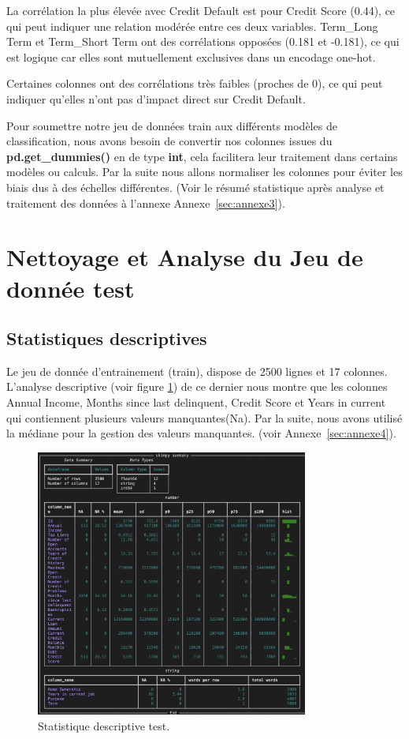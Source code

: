 \begin{flushleft}

La corrélation la plus élevée avec Credit Default est pour Credit Score (0.44), ce qui peut indiquer une relation modérée entre ces deux variables.
Term\_Long Term et Term\_Short Term ont des corrélations opposées (0.181 et -0.181), ce qui est logique car elles sont mutuellement exclusives dans un encodage one-hot.

Certaines colonnes ont des corrélations très faibles (proches de 0), ce qui peut indiquer qu'elles n'ont pas d'impact direct sur Credit Default.


Pour soumettre notre jeu de données train aux différents modèles de classification, nous avons besoin de convertir nos colonnes issues du \textbf{pd.get\_dummies()} en de type \textbf{int}, cela facilitera leur traitement dans certains modèles ou calculs. Par la suite nous allons normaliser les colonnes pour éviter les biais dus à des échelles différentes. (Voir le résumé statistique après analyse et traitement des données à l'annexe Annexe~\ref{sec:annexe3}).
\end{flushleft}

\section{Nettoyage et Analyse du Jeu de donnée test}
\subsection{Statistiques descriptives}

Le jeu de donnée d'entrainement (train), dispose de 2500 lignes et 17 colonnes. L'analyse descriptive (voir figure \ref{fig:stats_descriptive}) de ce dernier nous montre que les colonnes Annual Income, Months since last delinquent, Credit Score et Years in current qui contiennent plusieurs valeurs manquantes(Na). Par la suite, nous avons utilisé la médiane pour la gestion des valeurs manquantes. (voir Annexe~\ref{sec:annexe4}).

\begin{figure}[H]
\centering
\includegraphics[width=0.8\textwidth]{figures/fig2.png}
\caption{Statistique descriptive test.}
\label{fig:stats_descriptive}
\end{figure}


